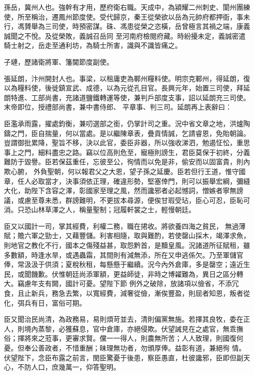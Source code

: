 \begin{pinyinscope}
 孫岳，冀州人也。強幹有才用，歷府衛右職。天成中，為潁耀二州刺史、閬州團練使，所至稱治，遷鳳州節度使。受代歸京，秦王從榮欲以岳為元帥府都押衙，事未行，馮贇舉為三司使，時預密謀。硃、馮患從榮之恣橫，岳曾極言其禍之端，康義誠聞之不悅。及從榮敗，義誠召岳同
 至河南府檢閱府藏。時紛擾未定，義誠密遣騎士射之，岳走至通利坊，為騎士所害，識與不識皆痛之。



 子璉，歷諸衛將軍、籓閫節度副使。



 張延朗，汴州開封人也。事梁，以租庸吏為鄆州糧料使。明宗克鄆州，得延朗，復以為糧料使，後徙鎮宣武、成德，以為元從孔目官。長興元年，始置三司使，拜延朗特進、工部尚書，充諸道鹽鐵轉運等使，兼判戶部度支事，詔以延朗充三司使。末帝即位，授禮部尚書，兼中書侍郎、
 平章事、判三司。延朗再上表辭曰：



 臣濫承雨露，擢處鈞衡，兼叨選部之銜，仍掌計司之重。況中省文章之地，洪爐陶鑄之門，臣自揣量，何以當處。是以繼陳章表，疊貢情誠，乞請睿恩，免貽朝論。豈謂御批累降，聖旨不移，決以此官，委臣非器，所以強收涕泗，勉遏怔忪，重思事上之門，細料盡忠之路。竊以位高則危至，寵極則謗生，君臣莫保于初終，分義難防于毀譽。臣若保茲重任，忘彼至公，徇情而以免是非，偷安而以固富貴，則內欺心腑，
 外負聖朝，何以報君父之大恩，望子孫之延慶。臣若但行王道，惟守國章，任人必取當才，決事須依正理，確違形勢，堅塞倖門，則可以振舉宏綱，彌縫大化，助陛下含容之澤，彰國家至理之風，然而讒邪者必起憾詞，憎嫉者寧無謗議，或慮至尊未悉，群謗難明，不更拔本尋源，便俟甘瑕受玷，臣心可忍，臣恥可消。只恐山林草澤之人，稱量聖制；冠履軒裳之士，輕慢朝廷。



 臣又以國計一司，掌其經費，利權二務，職在捃收。將欲養四海之貧民，
 無過薄賦；贍六軍之勁士，又藉豐儲。利害相隨，取與難酌，若使罄山採木，竭澤求魚，則地官之教化不行，國本之傷殘益甚，取怨黔首，是黷皇風。況諸道所征賦租，雖多數額，時逢水旱，或遇蟲霜，其間則有減無添，所在又申逃係欠。乃至軍儲官俸，常汲汲于供須；夏稅秋租，每懸懸于繼續。況今內外倉庫，多是罄空；遠近生民，或聞饑歉。伏惟朝廷尚添軍額，更益師徒，非時之博糴難為，異日之區分轉大。竊慮年支有闕，國計可憂。望陛下節
 例外之破除，放諸項以儉省，不添冗食，且止新兵，務急去繁，以寬經費，減奢從儉，漸俟豐盈，則屈者知恩，叛者從化，弭兵有日，富俗可期。



 臣又聞治民尚清，為政務易，易則煩苛並去，清則偏黨無施。若擇其良牧，委在正人，則境內蒸黎，必獲蘇息，官中倉庫，亦絕侵欺。伏望誡見在之處官，無乖撫俗；擇將來之蒞事，更審求賢。儻一一得人，則農無所苦；人人致理，則國復何憂。但奉公善政者，不惜重酬；昧理無功者，勿頒厚俸。益彰有道，兼絕徇
 情。伏望陛下，念臣布露之前言，閔臣驚憂于後患，察臣愚直，杜彼讒邪，臣即但副天心，不防人口，庶幾萬一，仰答聖明。




\end{pinyinscope}
